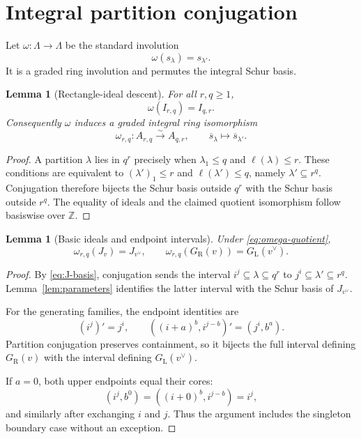 \documentclass[11pt]{amsart}
\newtheorem{lemma}[theorem]{Lemma}
\theoremstyle{definition}
\theoremstyle{remark}
\newcommand{\Z}{\mathbb Z}
\newcommand{\GL}{G_{\mathrm L}}
\newcommand{\GR}{G_{\mathrm R}}
\newcommand{\ol}[1]{\overline{#1}}
\begin{document}
\section{Integral partition conjugation}

Let $\omega:\Lambda\to\Lambda$ be the standard involution
\[
  \omega(s_\lambda)=s_{\lambda'}.
\]
It is a graded ring involution and permutes the integral Schur basis.

\begin{lemma}[Rectangle-ideal descent]\label{lem:omega-quotient}
For all $r,q\geq1$,
\[
  \omega(I_{r,q})=I_{q,r}.
\]
Consequently $\omega$ induces a graded integral ring isomorphism
\begin{equation}\label{eq:omega-quotient}
  \omega_{r,q}:A_{r,q}\xrightarrow{\sim}A_{q,r},
  \qquad
  \ol{s}_\lambda\longmapsto\ol{s}_{\lambda'}.
\end{equation}
\end{lemma}

\begin{proof}
A partition $\lambda$ lies in $q^r$ precisely when
$\lambda_1\leq q$ and $\ell(\lambda)\leq r$.  These conditions are equivalent
to $(\lambda')_1\leq r$ and $\ell(\lambda')\leq q$, namely
$\lambda'\subseteq r^q$.  Conjugation therefore bijects the Schur basis
outside $q^r$ with the Schur basis outside $r^q$.  The equality of ideals and
the claimed quotient isomorphism follow basiswise over $\Z$.
\end{proof}

\begin{lemma}[Basic ideals and endpoint intervals]\label{lem:omega-families}
Under \eqref{eq:omega-quotient},
\[
  \omega_{r,q}(J_v)=J_{v^\vee},
  \qquad
  \omega_{r,q}(\GR(v))=\GL(v^\vee).
\]
\end{lemma}

\begin{proof}
By \eqref{eq:J-basis}, conjugation sends the interval
$i^j\subseteq\lambda\subseteq q^r$ to
$j^i\subseteq\lambda'\subseteq r^q$.  Lemma~\ref{lem:parameters} identifies
the latter interval with the Schur basis of $J_{v^\vee}$.

For the generating families, the endpoint identities are
\begin{equation}\label{eq:endpoint-conjugation}
  (i^j)'=j^i,
  \qquad
  ((i+a)^b,i^{j-b})'=(j^i,b^a).
\end{equation}
Partition conjugation preserves containment, so it bijects the full interval
defining $\GR(v)$ with the interval defining $\GL(v^\vee)$.

If $a=0$, both upper endpoints equal their cores:
\[
  (i^j,b^0)=((i+0)^b,i^{j-b})=i^j,
\]
and similarly after exchanging $i$ and $j$.  Thus the argument includes the
singleton boundary case without an exception.
\end{proof}
\end{document}
